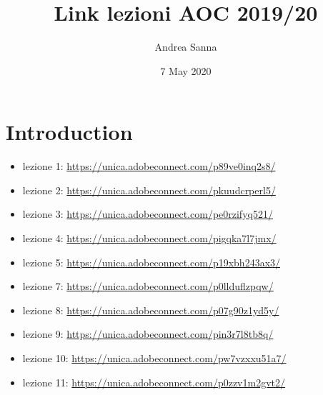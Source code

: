 \documentclass{article}
\title{Link lezioni AOC 2019/20}
\author{Andrea Sanna}
\date{7 May 2020}
\begin{document}
\maketitle

\section{Introduction}
\begin{itemize}
\item lezione 1: \url{https://unica.adobeconnect.com/p89ve0inq2s8/}\\
\item lezione 2: \url{https://unica.adobeconnect.com/pkuudcrperl5/}\\
\item lezione 3: \url{https://unica.adobeconnect.com/pe0rzifyq521/}\\
\item lezione 4: \url{https://unica.adobeconnect.com/pigqka7l7jmx/}\\
\item lezione 5: \url{https://unica.adobeconnect.com/p19xbh243ax3/}\\
\item lezione 7: \url{https://unica.adobeconnect.com/p0llduflzpqw/}\\
\item lezione 8: \url{https://unica.adobeconnect.com/p07g90z1yd5y/}\\
\item lezione 9: \url{https://unica.adobeconnect.com/pin3r7l8tb8q/}\\
\item lezione 10: \url{https://unica.adobeconnect.com/pw7vzxxu51a7/}\\
\item lezione 11: \url{https://unica.adobeconnect.com/p0zzv1m2gvt2/}\\
\end{itemize}
\end{document}
